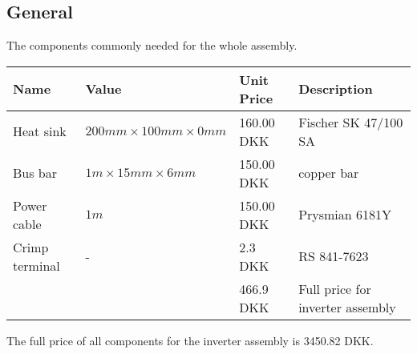 \subsection{General}
The components commonly needed for the whole assembly.
\begin{table}[H]
\centering
\footnotesize
\begin{tabular}{|p{2cm} p{3cm} p{2cm} p{6cm}|} \hline
\textbf{Name}    & \textbf{Value} & \textbf{Unit Price}
& \textbf{Description}                            \\ \hline
Heat sink            & $200mm \times 100mm \times 0mm $ & 160.00 DKK     & Fischer SK 47/100 SA  \\
Bus bar                  & $1m \times 15mm \times 6mm $ & 150.00 DKK     & copper bar            \\ 
Power cable              & $1m                        $ & 150.00 DKK     & Prysmian 6181Y        \\
Crimp terminal           & -                            & 2.3 DKK        & RS 841-7623           \\ \hline
&& 466.9 DKK & Full price for inverter assembly \\ \hline
\end{tabular}
\end{table}

The full price of all components for the inverter assembly is 3450.82 DKK.
